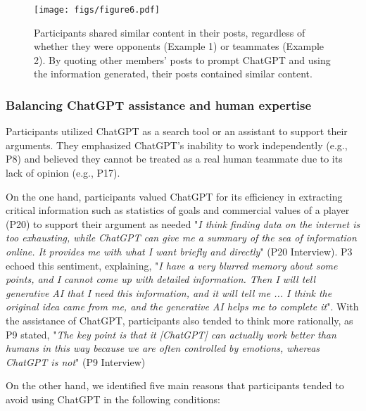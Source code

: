\begin{figure*}
    \centering
    \texttt{[image: figs/figure6.pdf]}
    \caption{Participants shared similar content in their posts, regardless of whether they were opponents (Example 1) or teammates (Example
2). By quoting other members' posts to prompt ChatGPT and using the information generated, their posts contained similar content.}
    \label{fig6}
\end{figure*}

\subsubsection{Balancing ChatGPT assistance and human expertise}

Participants utilized ChatGPT as a search tool or an assistant to support their arguments. They emphasized ChatGPT's inability to work independently (e.g., P8) and believed they cannot be treated as a real human teammate due to its lack of opinion (e.g., P17).

On the one hand, participants valued ChatGPT for its efficiency in extracting critical information such as statistics of goals and commercial values of a player (P20) to support their argument as needed "\textit{I think finding data on the internet is too exhausting, while ChatGPT can give me a summary of the sea of information online. It provides me with what I want briefly and directly}" (P20 Interview). P3 echoed this sentiment, explaining, "\textit{I have a very blurred memory about some points, and I cannot come up with detailed information. Then I will tell generative AI that I need this information, and it will tell me ... I think the original idea came from me, and the generative AI helps me to complete it}". With the assistance of ChatGPT, participants also tended to think more rationally, as P9 stated, "\textit{The key point is that it [ChatGPT] can actually work better than humans in this way because we are often controlled by emotions, whereas ChatGPT is not}" (P9 Interview)

On the other hand, we identified five main reasons that participants tended to avoid using ChatGPT in the following conditions: 

